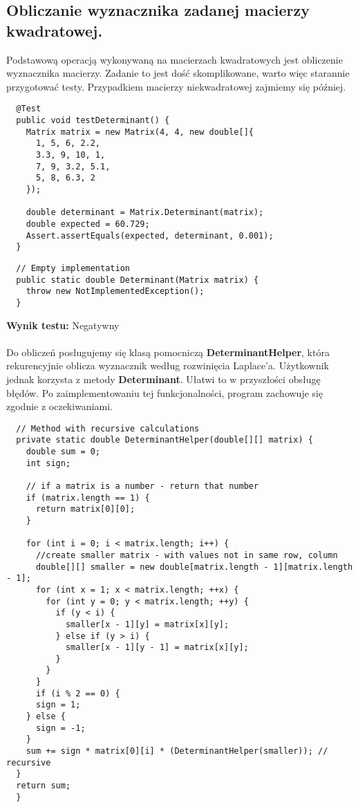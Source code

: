 \documentclass[a4paper,12pt,twoside]{article}
\begin{document}
\subsection{Obliczanie wyznacznika zadanej macierzy kwadratowej.}
\bigskip

Podstawową operacją wykonywaną na macierzach kwadratowych jest obliczenie
wyznacznika macierzy. Zadanie to jest dość skomplikowane, warto więc starannie przygotować
testy. Przypadkiem macierzy niekwadratowej zajmiemy się później.\\

\begin{lstlisting}
  @Test
  public void testDeterminant() {
    Matrix matrix = new Matrix(4, 4, new double[]{
      1, 5, 6, 2.2,
      3.3, 9, 10, 1,
      7, 9, 3.2, 5.1,
      5, 8, 6.3, 2
    });

    double determinant = Matrix.Determinant(matrix);
    double expected = 60.729;
    Assert.assertEquals(expected, determinant, 0.001);
  }
\end{lstlisting}

\begin{lstlisting}
  // Empty implementation
  public static double Determinant(Matrix matrix) {
    throw new NotImplementedException();
  }
\end{lstlisting}
\medskip

\noindent
\textbf{Wynik testu: }{\color{red} Negatywny}\\\\
Do obliczeń posługujemy się klasą pomocniczą \textbf{DeterminantHelper}, która rekurencyjnie oblicza wyznacznik
według rozwinięcia Laplace'a. Użytkownik jednak korzysta z metody \textbf{Determinant}. Ułatwi to w przyszłości
obsługę błędów. Po zaimplementowaniu tej funkcjonalności, program zachowuje się zgodnie z oczekiwaniami.\\

\begin{lstlisting}
  // Method with recursive calculations
  private static double DeterminantHelper(double[][] matrix) {
    double sum = 0;
    int sign;

    // if a matrix is a number - return that number
    if (matrix.length == 1) {
      return matrix[0][0];
    }

    for (int i = 0; i < matrix.length; i++) {
      //create smaller matrix - with values not in same row, column
      double[][] smaller = new double[matrix.length - 1][matrix.length - 1];
      for (int x = 1; x < matrix.length; ++x) {
        for (int y = 0; y < matrix.length; ++y) {
          if (y < i) {
            smaller[x - 1][y] = matrix[x][y];
          } else if (y > i) {
            smaller[x - 1][y - 1] = matrix[x][y];
          }
        }
      }
      if (i % 2 == 0) {
      sign = 1;
    } else {
      sign = -1;
    }
    sum += sign * matrix[0][i] * (DeterminantHelper(smaller)); // recursive
  }
  return sum;
  }
\end{lstlisting}
\end{document}
